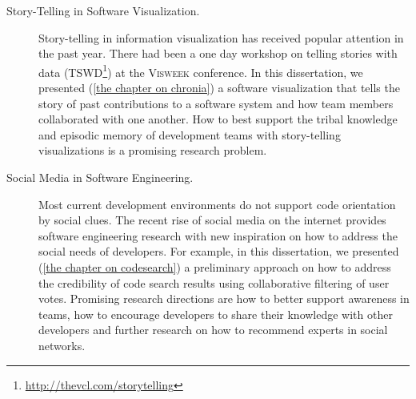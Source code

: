 \begin{description}
\item[Story-Telling in Software Visualization.] 
%
Story-telling in information visualization has received popular attention in the past year. There had been a one day workshop on telling stories with data (TSWD\footnote{\url{http://thevcl.com/storytelling}}) at the \textsc{Visweek} conference. In this dissertation, we presented (\autoref{the chapter on chronia}) a software visualization that tells the story of past contributions to a software system and how team members collaborated with one another. How to best support the tribal knowledge and episodic memory of development teams with story-telling visualizations is a promising research problem.

\item[Social Media in Software Engineering.] 
%
Most current development environments do not support code orientation by social clues.  
The recent rise of social media on the internet provides software engineering research with new inspiration on how to address the social needs of developers. For example, in this dissertation, we presented (\autoref{the chapter on codesearch}) a preliminary approach on how to address the credibility of code search results using collaborative filtering of user votes. Promising research directions are how to better support awareness in teams, how to encourage developers to share their knowledge with other developers and further research on how to recommend experts in social networks.

\item[]
\end{description}

